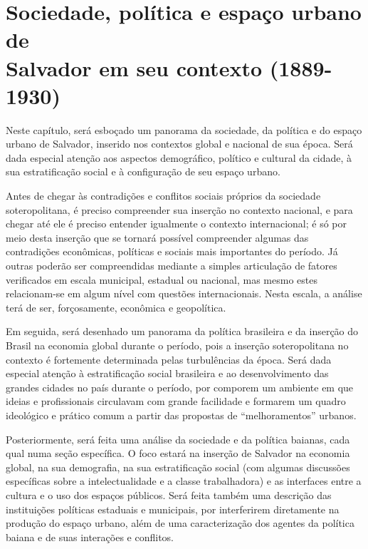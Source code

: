 \chapter[Sociedade, política e espaço urbano de Salvador em seu contexto (1889-1930)]{Sociedade, política e espaço urbano de \\Salvador em seu contexto (1889-1930)}\label{cap:1}

Neste capítulo, será esboçado um panorama da sociedade, da política e do espaço urbano de Salvador, inserido nos contextos global e nacional de sua época. Será dada especial atenção aos aspectos demográfico, político e cultural da cidade, à sua estratificação social e à configuração de seu espaço urbano.

Antes de chegar às contradições e conflitos sociais próprios da sociedade soteropolitana, é preciso compreender sua inserção no contexto nacional, e para chegar até ele é preciso entender igualmente o contexto internacional; é só por meio desta inserção que se tornará possível compreender algumas das contradições econômicas, políticas e sociais mais importantes do período. Já outras poderão ser compreendidas mediante a simples articulação de fatores verificados em escala municipal, estadual ou nacional, mas mesmo estes relacionam-se em algum nível com questões internacionais. Nesta escala, a análise terá de ser, forçosamente, econômica e geopolítica.

Em seguida, será desenhado um panorama da política brasileira e da inserção do Brasil na economia global durante o período, pois a inserção soteropolitana no contexto é fortemente determinada pelas turbulências da época. Será dada especial atenção à estratificação social brasileira e ao desenvolvimento das grandes cidades no país durante o período, por comporem um ambiente em que ideias e profissionais circulavam com grande facilidade e formarem um quadro ideológico e prático comum a partir das propostas de ``melhoramentos'' urbanos.

Posteriormente, será feita uma análise da sociedade e da política baianas, cada qual numa seção específica. O foco estará na inserção de Salvador na economia global, na sua demografia, na sua estratificação social (com algumas discussões específicas sobre a intelectualidade e a classe trabalhadora) e as interfaces entre a cultura e o uso dos espaços públicos. Será feita também uma descrição das instituições políticas estaduais e municipais, por interferirem diretamente na produção do espaço urbano, além de uma caracterização dos agentes da política baiana e de suas interações e conflitos.


